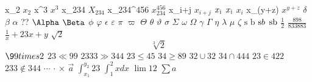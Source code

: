x_2 $x_2$
x^3 $x^3$
x_{234} $X_{234}$
x_{234}^{456} $x_{234}^{456}$
x_{i+j} $x_{i+j}$
$x_{\rm i}$
$x_{\text i}$
$x_i$
x_(y+z) $x^{y+z}$
\delta $\delta$
\beta $\beta$
\alpha $\alpha$
\Alpha ?? $\Alpha$
\Beta $\Beta$
\phi $\phi$
\varphi $\varphi$
\epsilon $\epsilon$
\varepsilon $\varepsilon$
\pi $\pi$
\varpi $\varpi$
\Theta $\Theta$
\theta $\theta$
\vartheta $\vartheta$
\sigma $\sigma$
\Sigma $\Sigma$
\omega $\omega$
\Omega $\Omega$
\gamma $\gamma$
\Gamma $\Gamma$
\eta $\eta$
\lambda $\lambda$
\mu $\mu$
\zeta $\zeta$
$\text {s  b}$
$\text s  b$
$\rm s b$
$\frac 1 2$
$\frac {898} {833883}$
${\frac 1 x + 23} {x+y}$
$\sqrt 2 $
$$ \sqrt [3] 2 $$
$\99 times 2$
$23 \ll 99$
$2333 \gg 344$
$23 \le 45$
$34 \ge 89$
$32 \cup 32$
$ 34 \cap 444$
$23 \in 422$
$233 \notin 344$
$\cdots$
$\cdot$
$\times$
$\vec a$
$\int_{x_1}^{y_2} 23$
$\int_{1}^{2}{x}dx$
$\lim 1 2$
$\sum a$
